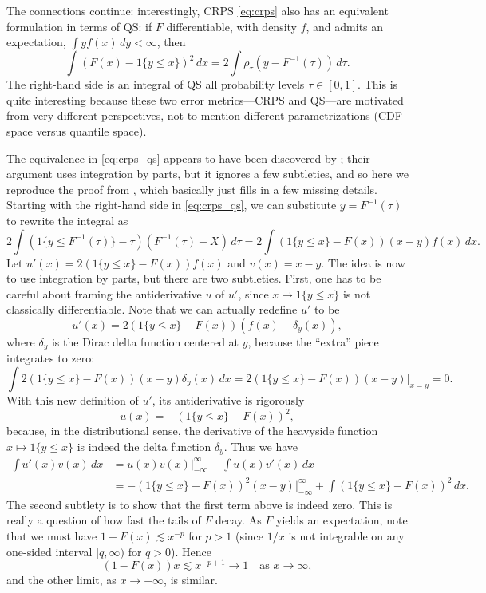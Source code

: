 \documentclass{article}
\begin{document}
The connections continue: interestingly, CRPS \eqref{eq:crps} also has an
equivalent formulation in terms of QS: if $F$ differentiable, with density $f$,
and admits an expectation, $\int y f(x) \, dy < \infty$, then    
\begin{equation}
\label{eq:crps_qs}
\int (F(x) - 1\{y \leq x\})^2 \, dx = 
2 \int \rho_\tau(y - F^{-1}(\tau)) \, d\tau. 
\end{equation}
The right-hand side is an integral of QS all probability levels $\tau \in [0,1]$.
This is quite interesting because these two error metrics---CRPS and QS---are 
motivated from very different perspectives, not to mention different
parametrizations (CDF space versus quantile space).   

The equivalence in \eqref{eq:crps_qs} appears to have been discovered by
\citet{laio2007verification}; their argument uses integration by parts, but it
ignores a few subtleties, and so here we reproduce the proof from
\citet{fakoor2021flexible}, which basically just fills in a few missing details.
Starting with the right-hand side in \eqref{eq:crps_qs}, we can substitute 
$y=F^{-1}(\tau)$ to rewrite the integral as   
\[
2 \int (1\{y \leq F^{-1}(\tau)\} - \tau) (F^{-1}(\tau)-X) \, d\tau =  
2 \int (1\{y \leq x\} - F(x)) (x-y) f(x) \, dx.
\]
Let $u'(x)=2(1\{y \leq x\} - F(x)) f(x)$ and $v(x)=x-y$. The idea is now to use 
integration by parts, but there are two subtleties. First, one has to be careful 
about framing the antiderivative $u$ of $u'$, since $x \mapsto 1\{y \leq x\}$ is
not classically differentiable. Note that we can actually redefine $u'$ to be   
\[
u'(x) = 2(1\{y \leq x\} - F(x)) (f(x) - \delta_y(x)),
\]
where $\delta_y$ is the Dirac delta function centered at $y$, because the
``extra'' piece integrates to zero:   
\[
\int 2(1\{y \leq x\} - F(x)) (x-y) \delta_y(x) \, dx =  
2(1\{y \leq x\} - F(x)) (x-y) \Big|_{x=y} = 0. 
\]
With this new definition of $u'$, its antiderivative is rigorously
\[
u(x) = -(1\{y \leq x\} - F(x))^2,
\] 
because, in the distributional sense, the derivative of the heavyside function
$x \mapsto 1\{y \leq x\}$ is indeed the delta function $\delta_y$. Thus we have   
\begin{align*}
\int u'(x) v(x) \, dx
&= u(x) v(x) \Big|_{-\infty}^\infty - \int u(x) v'(x) \,  dx \\ 
&= -(1\{y \leq x\} - F(x))^2 (x-y) \Big|_{-\infty}^\infty + 
\int (1\{y \leq x\} - F(x))^2 \, dx. 
\end{align*}
The second subtlety is to show that the first term above is indeed zero.  
This is really a question of how fast the tails of $F$ decay. As $F$ yields an
expectation, note that we must have $1-F(x) \lesssim x^{-p}$ for $p>1$ (since
$1/x$ is not integrable on any one-sided interval $[q,\infty)$ for $q>0$). Hence   
\[
(1-F(x)) x \lesssim x^{-p+1} \to 1 \quad \text{as $x \to \infty$},
\]
and the other limit, as $x \to -\infty$, is similar.
\end{document}
